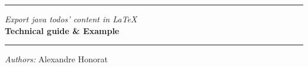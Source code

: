 \begin{titlepage}

  \vspace{4cm}

  \hrule
  \begin{center}
    \Huge{\textit{Export java todos' content in \LaTeX}}\\
    \vspace{0.5cm}
    \huge\textbf{Technical guide \& Example}\\
  \end{center}
  \hrule

  \vspace{6cm}
  \large{\emph{Authors:} Alexandre Honorat}
  \vspace{1cm}
  \center{\today}

\end{titlepage}
